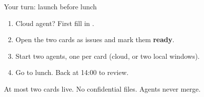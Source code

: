 \begin{frame}{Your turn: launch before lunch}
  \vspace{0.3em}
  \begin{enumerate}
    \item Cloud agent? First fill in .
    \item Open the two cards as issues and mark them \textbf{ready}.
    \item Start two agents, one per card (cloud, or two local windows).
    \item Go to lunch. Back at 14:00 to review.
  \end{enumerate}
  \vspace{0.4em}
  {\small At most two cards live. No confidential files. Agents never merge.}
\end{frame}
